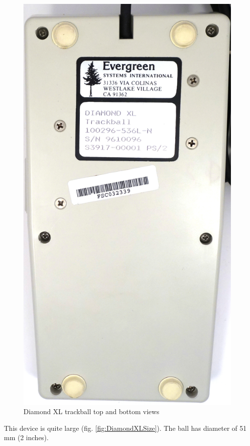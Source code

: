 \documentclass[11pt, a4paper]{article}
\begin{document}
\begin{figure}[h]
    \includegraphics[scale=0.35]{1993_evergreen_diamond_xl_trackball/bottom_30.jpg}
    \caption{Diamond XL trackball top and bottom views}
     \label{fig:DiamondXLTopBottom}
\end{figure}

This device is quite large (fig. \ref{fig:DiamondXLSize}). The ball has diameter of 51 mm (2 inches).
\end{document}
